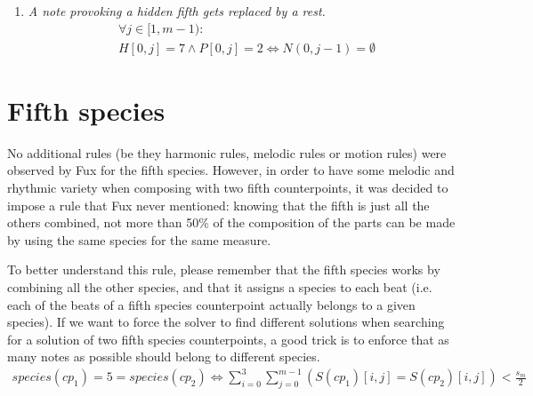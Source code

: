 \begin{enumerate}[wide, label=\bfseries 4.P\arabic*]
    \item \textit{A note provoking a hidden fifth gets replaced by a rest.} \label{constraint:hidden-fifths}
    \begin{equation}
        \begin{aligned}
            &\forall j \in [1, m-1):\\
            &H[0, j] = 7 \land P[0,j] = 2 \iff N(0, j-1) = \emptyset  
        \end{aligned}
    \end{equation}


\end{enumerate}

\section{Fifth species}
No additional rules (be they harmonic rules, melodic rules or motion rules) were observed by Fux for the fifth species.
However, in order to have some melodic and rhythmic variety when composing with two fifth counterpoints, it was decided to impose a rule that Fux never mentioned: knowing that the fifth is just all the others combined, not more than 50\% of the composition of the parts can be made by using the same species for the same measure.


To better understand this rule, please remember that the fifth species works by combining all the other species, and that it assigns a species to each beat (i.e. each of the beats of a fifth species counterpoint actually belongs to a given species). If we want to force the solver to find different solutions when searching for a solution of two fifth species counterpoints, a good trick is to enforce that as many notes as possible should belong to different species.
\begin{equation}
\begin{aligned}
species(cp_1) = 5 = species(cp_2)  \iff \sum_{i=0}^{3} \sum_{j=0}^{m-1} (S(cp_1)[i,j] = S(cp_2)[i,j]) < \frac{s_m}{2}
\end{aligned}
\end{equation}
